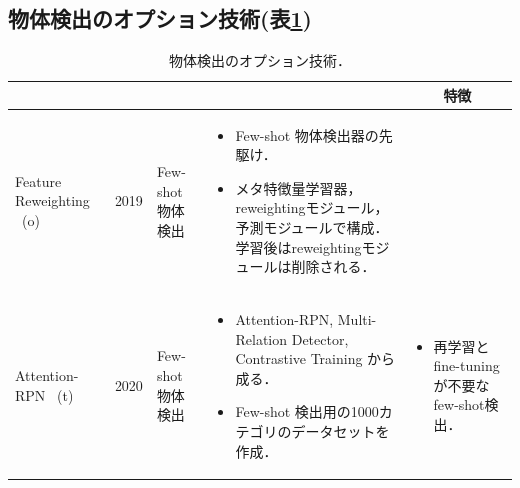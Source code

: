 \documentclass[twocolumn]{jsarticle} %
\begin{document}
\subsection{物体検出のオプション技術(表\ref{tbl-select-sub})}
\begin{table}
    \caption{物体検出のオプション技術．}
    \label{tbl-select-sub}
    \begin{center}
        \setlength{\tabcolsep}{3pt}
        \footnotesize
        \begin{tabularx}{\linewidth}{XcXp{7cm}X} \toprule
            \centering{モデル名称[文献]} & \centering{発行年} & \centering{用途} & \centering{概要} & \multicolumn{1}{c}{特徴} \\ \midrule

            Feature Reweighting \cite{KLWYFD19} \ (o)
            \vspace{0.7\baselineskip}
            \footnote[1] 
             & 2019 & Few-shot 物体検出 & 
            \begin{itemize}
                \vspace{-0.7\baselineskip}
                \setlength{\leftskip}{-3mm}
                \item Few-shot 物体検出器の先駆け．
                \item メタ特徴量学習器，reweightingモジュール，予測モジュールで構成．学習後はreweightingモジュールは削除される．
            \end{itemize}
            &
            \\

            Attention-RPN \cite{FZTT20} \ (t)
            \vspace{0.7\baselineskip}
            \footnote[2] & 2020 & Few-shot 物体検出 & 
            \begin{itemize}
                \vspace{-0.7\baselineskip}
                \setlength{\leftskip}{-3mm}
                \item Attention-RPN, Multi-Relation Detector, Contrastive Training から成る．
                \item Few-shot 検出用の1000カテゴリのデータセットを作成．
            \end{itemize}
            &
            \begin{itemize}
                \vspace{-0.7\baselineskip}
                \setlength{\leftskip}{-3mm}
                \item 再学習とfine-tuningが不要なfew-shot検出．
            \end{itemize}
            \\


\end{tabularx}
\end{center}
\end{table}
\end{document}
